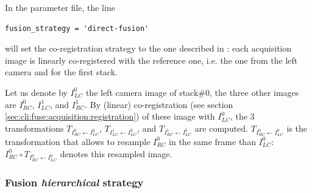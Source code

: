 In the parameter file, the line
\begin{verbatim}
fusion_strategy = 'direct-fusion'
\end{verbatim}
will set the co-registration strategy to the one described in \cite{guignard:tel-01278725,guignard:hal-01938126}: each acquisition image is linearly co-registered with the reference one, i.e. the one from the left camera and for the first stack.

Let us denote by $I^{0}_{LC}$ the left camera image of stack\#0, the three other images are $I^{0}_{RC}$, $I^{1}_{LC}$, and $I^{1}_{RC}$. By (linear) co-registration (see section \ref{sec:cli:fuse:acquisition:registration}) of these image with $I^{0}_{LC}$, the 3 transformations
$T_{I^{0}_{RC} \leftarrow I^{0}_{LC}}$,
$T_{I^{1}_{LC} \leftarrow I^{0}_{LC}}$, and
$T_{I^{1}_{RC} \leftarrow I^{0}_{LC}}$
are computed.
$T_{I^{0}_{RC} \leftarrow I^{0}_{LC}}$ is the transformation that allows to resample $I^{0}_{RC}$ in the same frame than $I^{0}_{LC}$:
$I^{0}_{RC} \circ T_{I^{0}_{RC} \leftarrow I^{0}_{LC}}$ denotes this resampled image.


\subsubsection{Fusion \textit{hierarchical} strategy}

